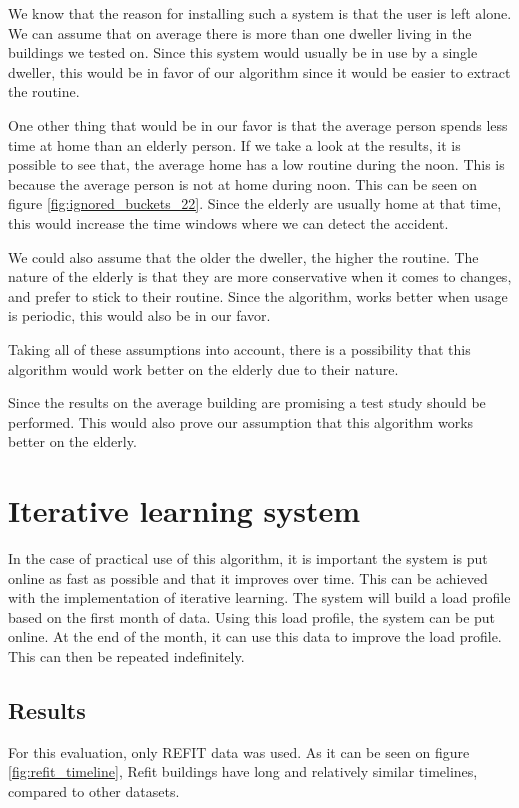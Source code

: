 We know that the reason for installing such a system is that the user is left alone.
We can assume that on average there is more than one dweller living in the buildings we tested on.
Since this system would usually be in use by a single dweller,
this would be in favor of our algorithm since it would be 
easier to extract the routine.

One other thing that would be in our favor is that the average person spends less time at home than an elderly person. 
If we take a look at the results, it is possible to see that,
the average home has a low routine during the noon. 
This is because the average person is not at home during noon.
This can be seen on figure \ref{fig:ignored_buckets_22}.
Since the elderly are usually home at that time, this would 
increase the time windows where we can detect the accident.

We could also assume that the older the dweller, the higher the routine. 
The nature of the elderly is that they are more conservative when it comes to changes, and prefer to stick to their routine.
Since the algorithm, works better when usage is periodic, this would also be in our favor. 

Taking all of these assumptions into account, 
there is a possibility that this algorithm would work 
better on the elderly due to their nature.

Since the results on the average building are promising
a test study should be performed. 
This would also prove our assumption that this algorithm works 
better on the elderly.

\section{Iterative learning system}

In the case of practical use of this algorithm, it is 
important the system is put online as fast as possible and that it improves over time. 
This can be achieved with the implementation of iterative learning.
The system will build a load profile based on the first month of data.
Using this load profile, the system can be put online.
At the end of the month, it can use this data to improve the load profile.
This can then be repeated indefinitely. 

\subsection{Results}

For this evaluation, only REFIT \cite{REFIT} data was used. 
As it can be seen on figure \ref{fig:refit_timeline},
Refit buildings have long and relatively similar timelines,
compared to other datasets.

